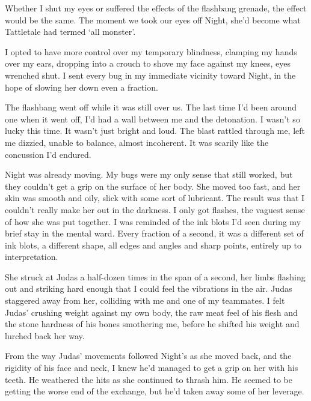 





Whether I shut my eyes or suffered the effects of the flashbang grenade, the effect would be the same.  The moment we took our eyes off Night, she'd become what Tattletale had termed `all monster'.



I opted to have more control over my temporary blindness, clamping my hands over my ears, dropping into a crouch to shove my face against my knees, eyes wrenched shut.  I sent every bug in my immediate vicinity toward Night, in the hope of slowing her down even a fraction.



The flashbang went off while it was still over us.  The last time I'd been around one when it went off, I'd had a wall between me and the detonation.  I wasn't so lucky this time.  It wasn't just bright and loud.  The blast rattled through me, left me dizzied, unable to balance, almost incoherent.  It was scarily like the concussion I'd endured.



Night was already moving.  My bugs were my only sense that still worked, but they couldn't get a grip on the surface of her body.  She moved too fast, and her skin was smooth and oily, slick with some sort of lubricant.  The result was that I couldn't really make her out in the darkness.  I only got flashes, the vaguest sense of how she was put together.  I was reminded of the ink blots I'd seen during my brief stay in the mental ward.  Every fraction of a second, it was a different set of ink blots, a different shape, all edges and angles and sharp points, entirely up to interpretation.



She struck at Judas a half-dozen times in the span of a second, her limbs flashing out and striking hard enough that I could feel the vibrations in the air.  Judas staggered away from her, colliding with me and one of my teammates.  I felt Judas' crushing weight against my own body, the raw meat feel of his flesh and the stone hardness of his bones smothering me, before he shifted his weight and lurched back her way.



From the way Judas' movements followed Night's as she moved back, and the rigidity of his face and neck, I knew he'd managed to get a grip on her with his teeth.  He weathered the hits as she continued to thrash him.  He seemed to be getting the worse end of the exchange, but he'd taken away some of her leverage.



